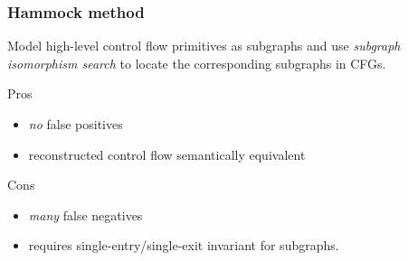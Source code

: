 \documentclass[aspectratio=1610]{beamer}
\begin{document}
\begin{frame}
	\frametitle{Hammock method}

	Model high-level control flow primitives as subgraphs and use \textit{subgraph isomorphism search} to locate the corresponding subgraphs in CFGs.

	\vspace*{2em}

	\begin{block}{Pros}
		\begin{itemize}
			\item \textit{no} false positives
			\item reconstructed control flow semantically equivalent
		\end{itemize}
	\end{block}

	\begin{block}{Cons}
		\begin{itemize}
			\item \textit{many} false negatives
			\item requires single-entry/single-exit invariant for subgraphs.
		\end{itemize}
	\end{block}

\end{frame}
\end{document}
